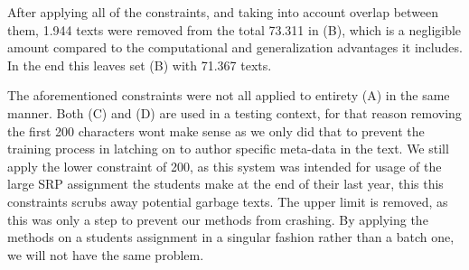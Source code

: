After applying all of the constraints, and taking into account
overlap between them, 1.944 texts were removed from the total 73.311 in (B),
which is a negligible amount compared to the computational and generalization
advantages it includes.
In the end this leaves set (B) with 71.367 texts.

The aforementioned constraints were not all applied to entirety (A) in the same
manner. Both (C) and (D) are used in a testing context, for that reason removing
the first 200 characters wont make sense as we only did that to prevent the
training process in latching on to author specific meta-data in the text. We
still apply the lower constraint of 200, as this system was intended for usage
of the large SRP assignment the students make at the end of their last year,
this this constraints scrubs away potential garbage texts. The upper limit
is removed, as this was only a step to prevent our methods from crashing. By
applying the methods on a students assignment in a singular fashion rather than
a batch one, we will not have the same problem.


